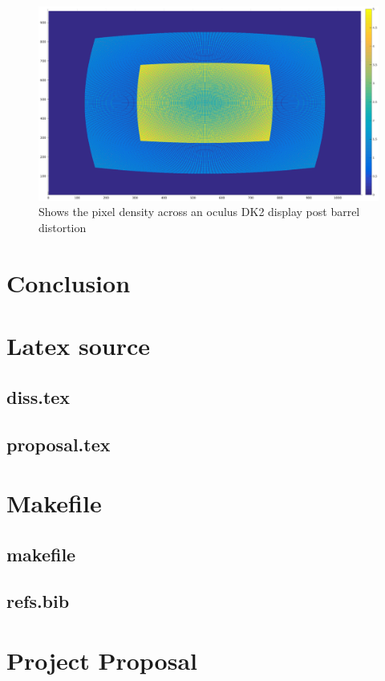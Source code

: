 \documentclass[12pt,a4paper,twoside,openright]{report}
\begin{document}
\begin{figure}[tbh]
\begin{center}
\includegraphics[width=12cm]{figs/oculus_pixel_density_optimisation.eps}
\caption{Shows the pixel density across an oculus DK2 display post barrel distortion}
\label{epsfig1}
\end{center}
\end{figure}




\chapter{Conclusion}





\appendix

\chapter{Latex source}

\section{diss.tex}
{\scriptsize}

\section{proposal.tex}
{\scriptsize}

\chapter{Makefile}

\section{makefile}\label{makefile}
{\scriptsize}

\section{refs.bib}
{\scriptsize}


\chapter{Project Proposal}


\end{document}
